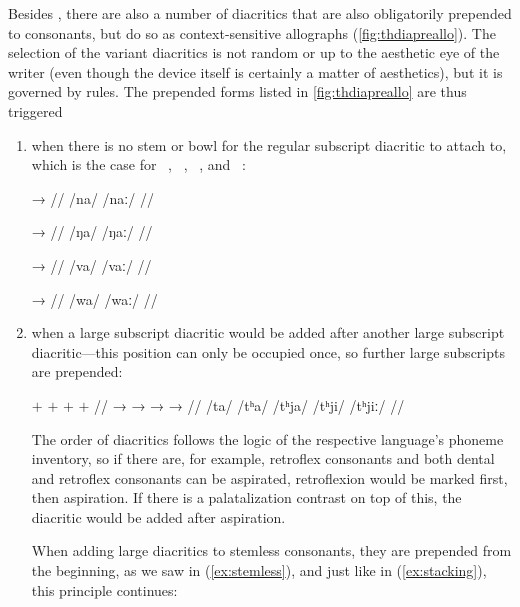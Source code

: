 Besides , there are also a number of diacritics that are also
obligatorily prepended to consonants, but do so as context-sensitive allographs
(\autoref{fig:thdiapreallo}). The selection of the variant diacritics is not
random or up to the aesthetic eye of the writer (even though the device itself
is certainly a matter of aesthetics), but it is governed by rules. The
prepended forms listed in \autoref{fig:thdiapreallo} are thus triggered

\begin{enumerate}
\item when there is no stem or bowl for the regular subscript diacritic to 
	attach to, which is the case for ~, ~, 
	~, and ~:
	
	\begin{multicols}{2}
	\pex[lingstyle=thex,]\label{ex:stemless}
	\a\begingl
		\gla {} →  //
		\glb /na/ {} /naː/ //
	\endgl
	
	\a\begingl
		\gla {} →  //
		\glb /ŋa/ {} /ŋaː/ //
	\endgl
	
	\a\begingl
		\gla {} →  //
		\glb /va/ {} /vaː/ //
	\endgl
	
	\a\begingl
		\gla {} →  //
		\glb /wa/ {} /waː/ //
	\endgl
	
	\xe
	\end{multicols}

\item when a large subscript diacritic would be added after another large 
	subscript diacritic---this position can only be occupied once, so 
	further large subscripts are prepended:
	
	\ex[lingstyle=thex,everygla=\normalsize,everyglb=\upshape\Large,
		aboveglcskip=0.5em,numoffset=\leftmargin]\label{ex:stacking}
	\begingl
		\gla {} {$+$ } {} {$+$ } {} {$+$ } {}
			{$+$ } {} //
		\glb {} →  →  →  → 
			 //
		\glc /ta/ {} /tʰa/ {} /tʰja/ {} /tʰji/ {} /tʰjiː/ //
	\endgl\xe
	
	The order of diacritics follows the logic of the respective 
	language's phoneme inventory, so if there are, for example, 
	retroflex consonants and both dental and retroflex consonants can be 
	aspirated, retroflexion would be marked first, then aspiration. If 
	there is a palatalization contrast on top of this, the diacritic would 
	be added after aspiration.
	
	When adding large diacritics to stemless consonants, they are prepended 
	from the beginning, as we saw in (\ref{ex:stemless}), and just like in 
	(\ref{ex:stacking}), this principle continues:
	

\end{enumerate}
